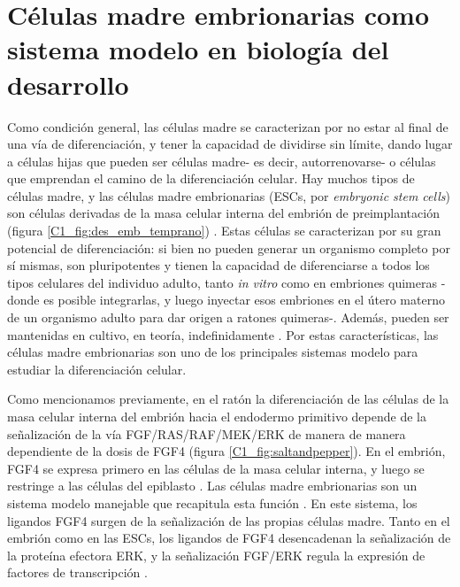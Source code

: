 \documentclass[./main.tex]{subfiles}
\begin{document}
\section{Células madre embrionarias como sistema modelo en biología del desarrollo}
\label{C1_sec:ESC}

Como condición general, las células madre se caracterizan por no estar al final de una vía de diferenciación, y tener la capacidad de dividirse sin límite, dando lugar a células hijas que pueden ser células madre- es decir, autorrenovarse- o células que emprendan el camino de la diferenciación celular. Hay muchos tipos de células madre, y las células madre embrionarias (ESCs, por \textit{embryonic stem cells}) son células derivadas de la masa celular interna del embrión de preimplantación (figura \ref{C1_fig:des_emb_temprano}) \cite{Ohtsuka2008}. Estas células se caracterizan por su gran potencial de diferenciación: si bien no pueden generar un organismo completo por sí mismas, son pluripotentes y tienen la capacidad de diferenciarse a todos los tipos celulares del individuo adulto, tanto \textit{in vitro} como en embriones quimeras -donde es posible integrarlas, y luego inyectar esos embriones en el útero materno de un organismo adulto para dar origen a ratones quimeras-\cite{Evans1981, Martin1981,Moustafa1972,Gardner1968}. Además, pueden ser mantenidas en cultivo, en teoría, indefinidamente \cite{Hiyama2007}. Por estas características, las células madre embrionarias son uno de los principales sistemas modelo para estudiar la diferenciación celular. 


Como mencionamos previamente, en el ratón la diferenciación de las células de la masa celular interna del embrión hacia el endodermo primitivo depende de la señalización de la vía FGF/RAS/RAF/MEK/ERK de manera de manera dependiente de la dosis de FGF4 (figura \ref{C1_fig:saltandpepper}). En el embrión, FGF4 se expresa primero en las células de la masa celular interna, y luego se restringe a las células del epiblasto \cite{Guo2010}. Las células madre embrionarias son un sistema modelo manejable que recapitula esta función \cite{Raina2021,Schroeter2015,Kunath2007,Molotkov2017,Coumoul2003}. En este sistema, los ligandos FGF4 surgen de la señalización de las propias células madre. Tanto en el embrión como en las ESCs, los ligandos de FGF4 desencadenan la señalización de la proteína efectora ERK, y la señalización FGF/ERK regula la expresión de factores de transcripción \cite{Kang2013,Krawchuk2013,Kunath2007,Nichols2009,Boroviak2014,Stavridis2007}. 
\end{document}
